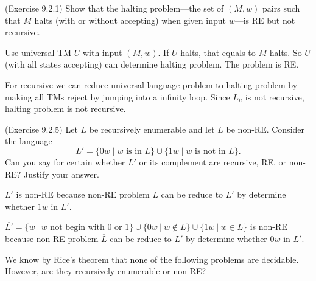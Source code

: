 \documentclass[10pt]{homework}
\begin{document}
\begin{problem} (Exercise 9.2.1) Show that the halting problem---the set of
  \((M, w)\) pairs such that \(M\) halts (with or without accepting) when given
  input \(w\)---is RE but not recursive.
\end{problem}

\begin{solution}
    Use universal TM $U$ with input $\left( M,w \right) $. If $U$ halts, that equals to $M$ halts. So $U$ (with all states accepting) can determine halting problem. The problem is RE.

    For recursive we can reduce universal language problem to halting problem by making all TMs reject by jumping into a infinity loop. Since $L_{u}$ is not recursive, halting problem is not recursive.
\end{solution}

\begin{problem}
  (Exercise 9.2.5) Let \(L\) be recursively enumerable and let \(\overline{L}\)
  be non-RE\@.
  Consider the language
  \begin{equation*}
    L' = \{0w \mid w \text{ is in } L\} \cup \{1w \mid w \text{ is not in } L\}.
  \end{equation*}
  Can you say for certain whether \(L'\) or its complement are recursive, RE, or
  non-RE\@?
  Justify your answer.
\end{problem}

\begin{solution}
    $L'$ is non-RE because non-RE problem $\overline{L}$ can be reduce to $L'$ by determine whether $1w$ in $L'$.

    $\overline{L'}=\{w\ |\ w\text{ not begin with }0\text{ or }1\}\cup\{0w\ |\ w\notin L\}\cup\{1w\ |\ w\in L\}$ is non-RE because non-RE problem $\overline{L}$ can be reduce to $\overline{L'}$ by determine whether $0w$ in $\overline{L'}$.
\end{solution}

\begin{problem}
  We know by Rice's theorem that none of the following problems are decidable.
  However, are they recursively enumerable or non-RE\@?
\end{problem}
\end{document}
